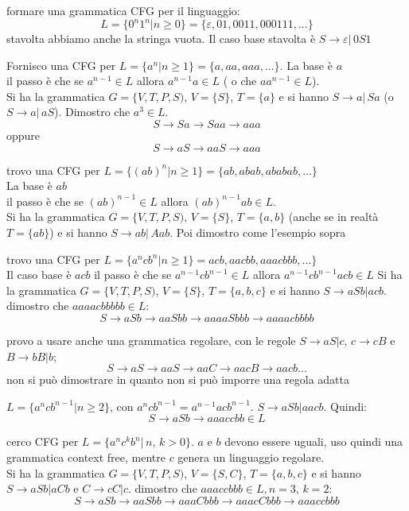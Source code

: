 \documentclass[a4paper,12pt, oneside]{book}
\begin{document}
\begin{esempio}
formare una grammatica CFG per il linguaggio:
$$L=\{0^n 1^n| n\geq 0\}=\{\varepsilon, 01, 0011, 000111,...\}$$
stavolta abbiamo anche la stringa vuota. Il caso base stavolta è $S\to\varepsilon| \, 0S1$ 
\end{esempio}
\begin{esempio}
Fornisco una CFG per $L=\{a^n|n\geq 1\}=\{a, aa, aaa,...\}$.
La base è $a$ \\il passo è che se $a^{n-1}\in L$ allora $a^{n-1}a\in L$ ( o che $aa^{n-1}\in L$).\\
Si ha la grammatica $G=\{V,T,P,S)$, $V=\{S\}$, $T=\{a\}$ e si hanno $S\to a|\,Sa$ (o  $S\to a|\,aS$). Dimostro che $a^3\in L$.
$$S\to Sa \to Saa\to aaa$$
oppure 
$$S\to aS\to aaS\to aaa$$
\end{esempio}
\begin{esempio}
trovo una CFG per $L=\{(ab)^n|n\geq 1\}=\{ab, abab, ababab,...\}$\\
La base è $ab$ \\il passo è che se $(ab)^{n-1}\in L$ allora $(ab)^{n-1}ab\in L$.\\
Si ha la grammatica $G=\{V,T,P,S)$, $V=\{S\}$, $T=\{a,b\}$ (anche se in realtà $T=\{ab\}$) e si hanno $S\to ab|\,Aab$. Poi dimostro come l'esempio sopra
\end{esempio}
\begin{esempio}
trovo una CFG per $L=\{a^n c b^n|n\geq 1\}=acb,aacbb,aaacbbb,...\}$\\
Il caso base è $acb$ il passo è che se $a^{n-1}cb^{n-1}\in L$ allora $a^{n-1}cb^{n-1}acb\in L$ 
Si ha la grammatica $G=\{V,T,P,S)$, $V=\{S\}$, $T=\{a,b,c\}$ e si hanno $S\to aSb|acb$.\\
dimostro che $aaaacbbbbb\in L$:
$$S\to aSb\to aaSbb\to aaaaSbbb\to aaaacbbbb$$

provo a usare anche una grammatica regolare, con le regole $S\to aS|c$, $c\to cB$ e $B\to bB|b$;
$$S\to aS\to aaS\to aaC\to aacB\to aacb...$$
non si può dimostrare in quanto non si può imporre una regola adatta
\end{esempio}
\begin{esempio}
$L=\{a^n c b^{n-1}|n\geq 2\}$, con $a^n c b^{n-1}=a^{n-1}acb^{n-1}$. $S\to aSb|aacb$. Quindi:
$$S\to aSb\to aaaccbb\in L$$
\end{esempio}
\begin{esempio}
cerco CFG per $L=\{a^n c^k b^n|\,n,\,k>0\}$. $a$ e $b$ devono essere uguali, uso quindi una grammatica context free, mentre $c$ genera un linguaggio regolare.\\
Si ha la grammatica $G=\{V,T,P,S)$, $V=\{S,C\}$, $T=\{a,b,c\}$ e si hanno $S\to aSb|aCb$ e $C\to cC|c$. dimostro che $aaaccbbb\in L, n=3,\, k=2$:
$$S\to aSb \to aaSbb\to aaaCbbb\to aaacCbbb\to aaaccbbb$$
\end{esempio}
\end{document}
